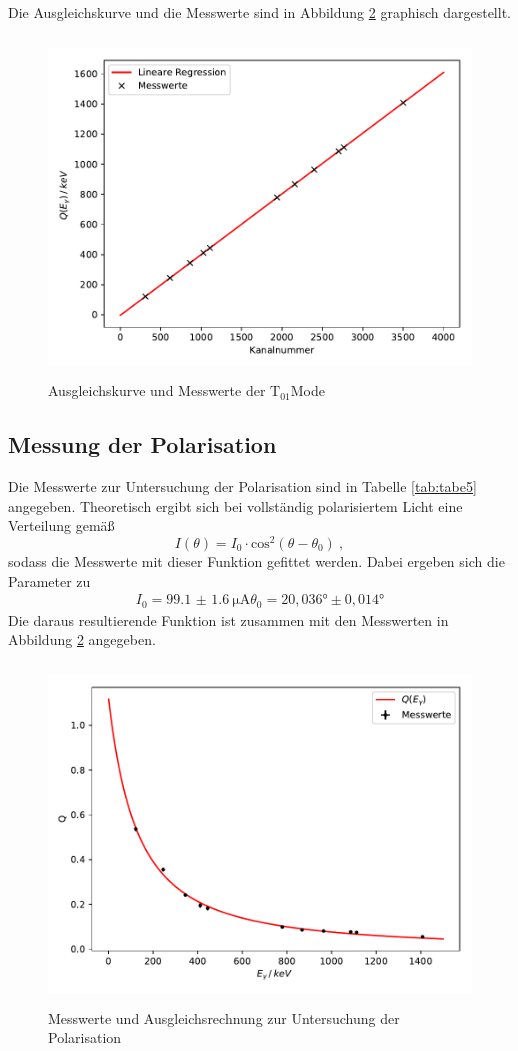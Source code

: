 Die Ausgleichskurve und die Messwerte sind in Abbildung \ref{fig:plot4} graphisch dargestellt.
\begin{figure}
  \centering
  \includegraphics[height=9cm]{Plot3.pdf}
  \caption{Ausgleichskurve und Messwerte der $\text{T}_{01}$Mode}
  \label{fig:plot4}
\end{figure}

\subsection{Messung der Polarisation}
Die Messwerte zur Untersuchung der Polarisation sind in Tabelle \ref{tab:tabe5} angegeben.
Theoretisch ergibt sich bei vollständig polarisiertem Licht eine Verteilung gemäß
\begin{equation}
  I(\theta) = I_0 \cdot \text{cos}^2(\theta-\theta_0) \:,
\end{equation}
sodass die Messwerte mit dieser Funktion gefittet werden. Dabei ergeben sich die Parameter zu
\begin{align*}
  I_0= \SI{99.1(16)}{\micro\ampere}
  \theta_0 = 20,036° \pm 0,014°
\end{align*}
Die daraus resultierende Funktion ist zusammen mit den Messwerten in Abbildung \ref{fig:plot4}
angegeben.
\begin{figure}
  \centering
  \includegraphics[height=9cm]{Plot4.pdf}
  \caption{Messwerte und Ausgleichsrechnung zur Untersuchung der Polarisation}
  \label{fig:plot4}
\end{figure}

